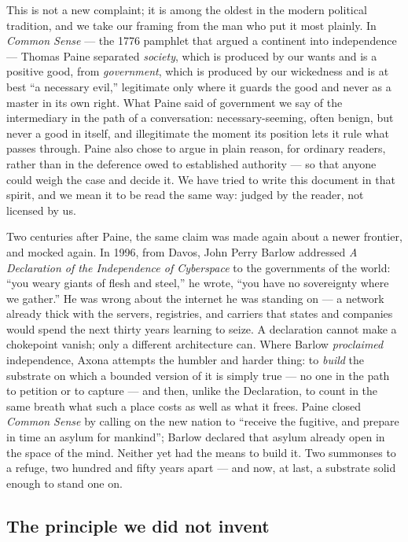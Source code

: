 \documentclass[nobib,justified]{tufte-handout}
\begin{document}
This is not a new complaint; it is among the oldest in the modern political
tradition, and we take our framing from the man who put it most plainly. In
\emph{Common Sense} --- the 1776 pamphlet that argued a continent into
independence --- Thomas Paine separated \emph{society}, which is produced by
our wants and is a positive good, from \emph{government}, which is produced by
our wickedness and is at best ``a necessary evil,'' legitimate only where it
guards the good and never as a master in its own right. What Paine said of
government we say of the intermediary in the path of a conversation:
necessary-seeming, often benign, but never a good in itself, and illegitimate
the moment its position lets it rule what passes through. Paine also chose to
argue in plain reason, for ordinary readers, rather than in the deference owed
to established authority --- so that anyone could weigh the case and decide it.
We have tried to write this document in that spirit, and we mean it to be read
the same way: judged by the reader, not licensed by us.

Two centuries after Paine, the same claim was made again about a newer
frontier, and mocked again. In 1996, from Davos, John Perry Barlow addressed
\emph{A Declaration of the Independence of Cyberspace} to the governments of
the world: ``you weary giants of flesh and steel,'' he wrote, ``you have no
sovereignty where we gather.'' He was wrong about the internet he was standing
on --- a network already thick with the servers, registries, and carriers that
states and companies would spend the next thirty years learning to seize. A
declaration cannot make a chokepoint vanish; only a different architecture can.
Where Barlow \emph{proclaimed} independence, Axona attempts the humbler and
harder thing: to \emph{build} the substrate on which a bounded version of it is
simply true --- no one in the path to petition or to capture --- and then,
unlike the Declaration, to count in the same breath what such a place costs as
well as what it frees. Paine closed \emph{Common Sense} by calling on the new
nation to ``receive the fugitive, and prepare in time an asylum for mankind'';
Barlow declared that asylum already open in the space of the mind. Neither yet
had the means to build it. Two summonses to a refuge, two hundred and fifty
years apart --- and now, at last, a substrate solid enough to stand one on.

\subsection{The principle we did not invent}
\end{document}
